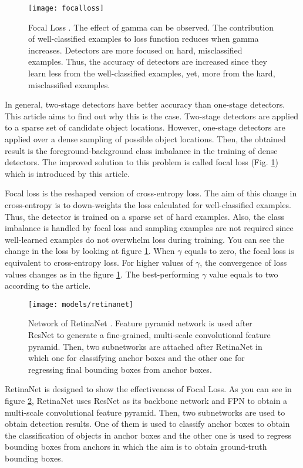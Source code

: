 \documentclass{article}
\begin{document}
\setlength{\parindent}{6ex}

\begin{figure}
    \centering
    \texttt{[image: focalloss]}
    \caption{Focal Loss \cite{flretnetcite}. The effect of 
    gamma can be observed. The contribution of well-classified 
    examples to loss function reduces when gamma increases. 
    Detectors are more focused on hard, misclassified examples. Thus, 
    the accuracy of detectors are increased since they learn less 
    from the well-classified examples, yet, more from the hard, 
    misclassified examples.}
    \label{fig:focalloss1}
\end{figure}

\indent

In general, two-stage detectors have better accuracy than one-stage 
detectors. This article aims to find out why this is the case. 
Two-stage detectors are applied to a sparse set of candidate object 
locations. However, one-stage detectors are applied over a dense sampling 
of possible object locations. Then, the obtained result is the 
foreground-background class imbalance in the training of dense detectors.
The improved solution to this problem is called focal loss (Fig. 
\ref{fig:focalloss1}) which is introduced by this article. \par

Focal loss \cite{flretnetcite} is the reshaped version of cross-entropy loss. The aim of 
this change in cross-entropy is to down-weights the loss calculated for 
well-classified examples. Thus, the detector is trained on a sparse set of 
hard examples. Also, the class imbalance is handled by focal loss and 
sampling examples are not required since well-learned examples do not 
overwhelm loss during training. You can see the change in the loss by looking at 
figure \ref{fig:focalloss1}. When $\gamma$ equals to zero, the focal loss is 
equivalent to cross-entropy loss. For higher values of $\gamma$, the 
convergence of loss values changes as in the figure \ref{fig:focalloss1}. 
The best-performing $\gamma$ value equals to two according to the article.

\begin{figure}
    \centering
    \texttt{[image: models/retinanet]}
    \caption{Network of RetinaNet \cite{flretnetcite}. Feature pyramid network 
    is used after ResNet to generate a fine-grained, multi-scale convolutional 
    feature pyramid. Then, two subnetworks are attached after RetinaNet in which 
    one for classifying anchor boxes and the other one for regressing final 
    bounding boxes from anchor boxes. }
    \label{fig:retinanet1}
\end{figure}
\indent

RetinaNet \cite{flretnetcite} is designed to show the effectiveness of Focal Loss. As you 
can see in figure \ref{fig:retinanet1}, RetinaNet uses ResNet as its 
backbone network and FPN to obtain a multi-scale convolutional feature 
pyramid. Then, two subnetworks are used to obtain detection results. 
One of them is used to classify anchor boxes to obtain the classification of 
objects in anchor boxes and the other one is used to regress bounding 
boxes from anchors in which the aim is to obtain ground-truth bounding 
boxes.
\end{document}
